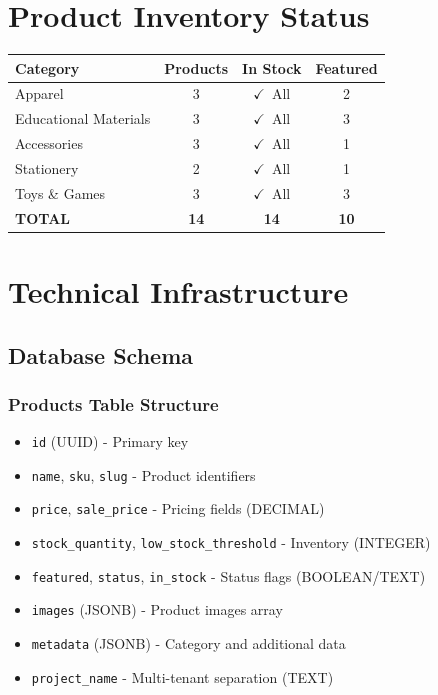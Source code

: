 \documentclass[11pt,a4paper]{article}
\newcommand{\mycheck}{\textcolor{ispeak-green}{\textbf{$\checkmark$}}}
\begin{document}
\section{Product Inventory Status}

\begin{center}
\begin{tabular}{|l|c|c|c|}
\hline
\rowcolor{header-bg!10}
\textbf{Category} & \textbf{Products} & \textbf{In Stock} & \textbf{Featured} \\
\hline
Apparel & 3 & \mycheck\ All & 2 \\
\hline
Educational Materials & 3 & \mycheck\ All & 3 \\
\hline
Accessories & 3 & \mycheck\ All & 1 \\
\hline
Stationery & 2 & \mycheck\ All & 1 \\
\hline
Toys \& Games & 3 & \mycheck\ All & 3 \\
\hline
\rowcolor{ispeak-green!10}
\textbf{TOTAL} & \textbf{14} & \textbf{14} & \textbf{10} \\
\hline
\end{tabular}
\end{center}

\newpage

\section{Technical Infrastructure}

\subsection{Database Schema}

\subsubsection{Products Table Structure}

\begin{tcolorbox}[colback=gray!5, colframe=ispeak-gray]
\begin{itemize}[leftmargin=*, label=•]
    \item \texttt{id} (UUID) - Primary key
    \item \texttt{name}, \texttt{sku}, \texttt{slug} - Product identifiers
    \item \texttt{price}, \texttt{sale\_price} - Pricing fields (DECIMAL)
    \item \texttt{stock\_quantity}, \texttt{low\_stock\_threshold} - Inventory (INTEGER)
    \item \texttt{featured}, \texttt{status}, \texttt{in\_stock} - Status flags (BOOLEAN/TEXT)
    \item \texttt{images} (JSONB) - Product images array
    \item \texttt{metadata} (JSONB) - Category and additional data
    \item \texttt{project\_name} - Multi-tenant separation (TEXT)
\end{itemize}
\end{tcolorbox}
\end{document}
